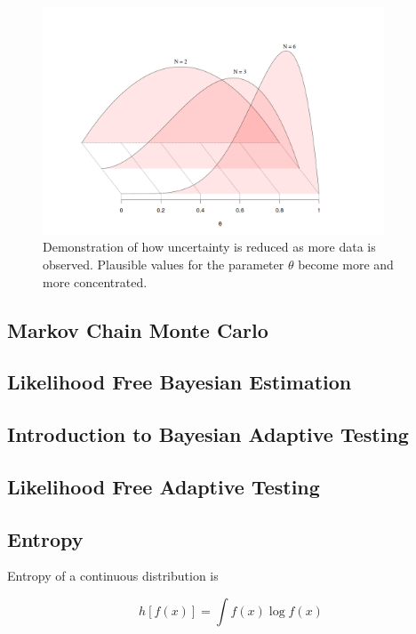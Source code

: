 \begin{figure}[htb]
	\begin{center}
		\includegraphics[width=4in]{Parts/TheoreticalBackground/Figs/sequentialBeta.png}
	\end{center}
	\caption{Demonstration of how uncertainty is reduced as more data is observed. Plausible values for the parameter $\theta$ become more and more concentrated.}
\end{figure}

\subsection{Markov Chain Monte Carlo}

\subsection{Likelihood Free Bayesian Estimation}

\subsection{Introduction to Bayesian Adaptive Testing}

\subsection{Likelihood Free Adaptive Testing}

\subsection{Entropy}

Entropy of a continuous distribution is

\begin{equation}
h[f(x)] = \int f(x)\log f(x)
\end{equation}

